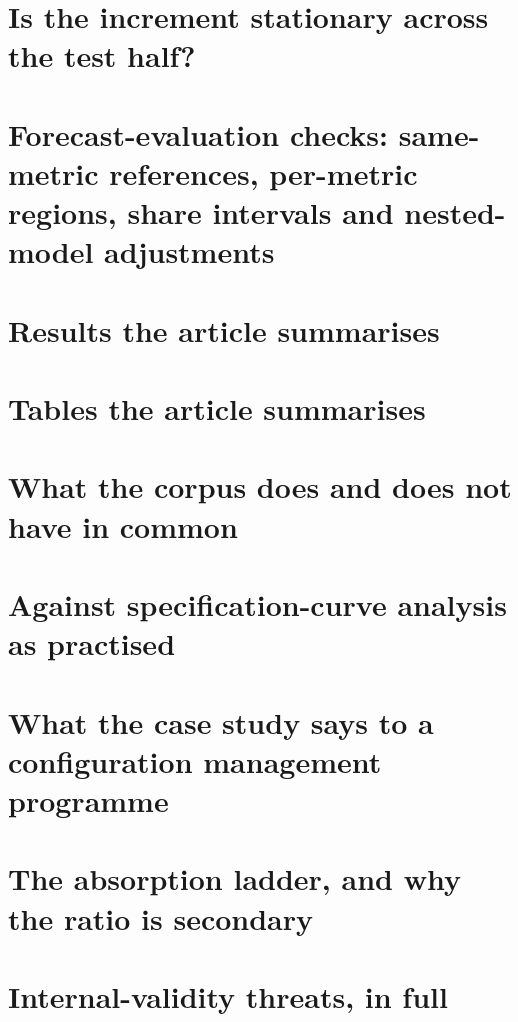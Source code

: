 \documentclass[preprint,12pt,authoryear]{elsarticle}
\theoremstyle{definition}
\begin{document}
\section{Is the increment stationary across the test half?}
\label{app:drift}


\section{Forecast-evaluation checks: same-metric references, per-metric regions, share intervals and nested-model adjustments}
\label{app:ijfchecks}


\section{Results the article summarises}
\label{app:secondary}


\section{Tables the article summarises}
\label{app:tables}


\section{What the corpus does and does not have in common}
\label{app:construct}


\section{Against specification-curve analysis as practised}
\label{app:sca}


\section{What the case study says to a configuration management programme}
\label{app:programmeread}


\section{The absorption ladder, and why the ratio is secondary}
\label{app:absorption}


\section{Internal-validity threats, in full}
\label{app:threats}

\end{document}
